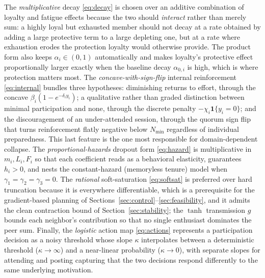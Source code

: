 \documentclass[11pt]{article}
\begin{document}
The \emph{multiplicative} decay \eqref{eq:decay} is chosen over an additive combination of loyalty and fatigue effects because the two should \emph{interact} rather than merely sum: a highly loyal but exhausted member should not decay at a rate obtained by adding a large protective term to a large depleting one, but at a rate where exhaustion erodes the protection loyalty would otherwise provide. The product form also keeps $\alpha_i\in(0,1)$ automatically and makes loyalty's protective effect proportionally larger exactly when the baseline decay $\alpha_{0,i}$ is high, which is where protection matters most. The \emph{concave-with-sign-flip} internal reinforcement \eqref{eq:internal} bundles three hypotheses: diminishing returns to effort, through the concave $\beta_i(1-e^{-\delta_i y_i})$; a qualitative rather than graded distinction between minimal participation and none, through the discrete penalty $-\chi_i\mathbf 1\{y_i=0\}$; and the discouragement of an under-attended session, through the quorum sign flip that turns reinforcement flatly negative below $N_{\min}$ regardless of individual preparedness. This last feature is the one most responsible for domain-dependent collapse. The \emph{proportional-hazards} dropout form \eqref{eq:hazard} is multiplicative in $m_i,L_i,F_i$ so that each coefficient reads as a behavioral elasticity, guarantees $h_i>0$, and nests the constant-hazard (memoryless tenure) model when $\gamma_1=\gamma_2=\gamma_3=0$. The \emph{rational} soft-saturation \eqref{eq:softsat} is preferred over hard truncation because it is everywhere differentiable, which is a prerequisite for the gradient-based planning of Sections~\ref{sec:control}--\ref{sec:feasibility}, and it admits the clean contraction bound of Section~\ref{sec:stability}; the $\tanh$ transmission $g$ bounds each neighbor's contribution so that no single enthusiast dominates the peer sum. Finally, the \emph{logistic} action map \eqref{eq:actions} represents a participation decision as a noisy threshold whose slope $\kappa$ interpolates between a deterministic threshold ($\kappa\to\infty$) and a near-linear probability ($\kappa\to0$), with separate slopes for attending and posting capturing that the two decisions respond differently to the same underlying motivation.
\end{document}
